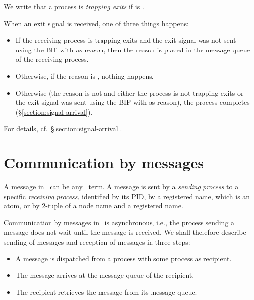 \label{section:receiving-exit-signal}

We write that a process  is \emph{trapping exits} if 
is .

When an exit signal is received, one of three things happens:
\begin{itemize}
\item If the receiving process is trapping exits and the exit signal
was not sent using the BIF  with
 as reason,
then the reason is placed in the message queue of the receiving
process.
\item Otherwise, if the reason is
, nothing happens.
\item Otherwise (the reason is not  and
either the process is not trapping exits or the exit signal
was sent using the BIF  with  as reason),
the process completes 
(\S\ref{section:signal-arrival}).
\end{itemize}

For details, cf.~\S\ref{section:signal-arrival}.

\section{Communication by messages}

\label{section:messages}

A message in \Erlang\ can be any \Erlang\ term. A message is sent by a
\emph{sending process} to a specific \emph{receiving process}, identified
by its PID, by a registered name, which is an atom, or by 2-tuple of a node name and
a registered name.

Communication by messages in \Erlang\ is asynchronous, i.e., the process sending
a message does not wait until the message is received.
We shall therefore describe sending of messages and reception of messages in three steps:
\begin{itemize}
\item A message is dispatched from a process with some process as recipient.
\item The message arrives at the message queue of the recipient.
\item The recipient retrieves the message from its message queue.
\end{itemize}

